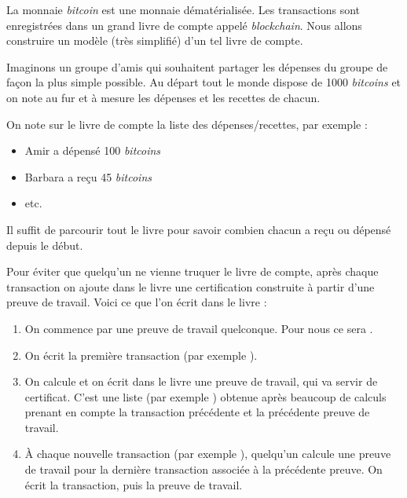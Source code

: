 \documentclass[11pt,class=report,crop=false]{standalone}
\begin{document}
\begin{cours}

La monnaie \emph{bitcoin} est une monnaie dématérialisée. Les transactions sont enregistrées dans un grand livre de compte appelé \emph{blockchain}. Nous allons construire un modèle (très simplifié) d'un tel livre de compte.


Imaginons un groupe d'amis qui souhaitent partager les dépenses du groupe de façon la plus simple possible. Au départ tout le monde dispose de 1000 \emph{bitcoins} et on note au fur et à mesure les dépenses et les recettes de chacun. 

On note sur le livre de compte la liste des dépenses/recettes, par exemple :
\begin{itemize}
  \item \og{}Amir a dépensé 100 \emph{bitcoins}\fg{}
  \item \og{}Barbara a reçu 45 \emph{bitcoins}\fg{}
  \item etc.
\end{itemize}
Il suffit de parcourir tout le livre pour savoir combien chacun a reçu ou dépensé depuis le début.

\bigskip

Pour éviter que quelqu'un ne vienne truquer le livre de compte, après chaque transaction on ajoute dans le livre une certification construite à partir d'une preuve de travail.
Voici ce que l'on écrit dans le livre :
\begin{enumerate}
  \item On commence par une preuve de travail quelconque. Pour nous ce sera 
  \ci{[0,0,0,0,0,0]}.
  \item On écrit la première transaction (par exemple ).
  \item On calcule et on écrit dans le livre une preuve de travail, qui va servir de certificat. C'est une liste
  (par exemple \ci{[56,42,10,98,2,34]}) obtenue après beaucoup de calculs prenant en compte la transaction précédente et la précédente preuve de travail.
  \item À chaque nouvelle transaction (par exemple ), quelqu'un calcule une preuve de travail pour la dernière transaction associée à la précédente preuve. On écrit la transaction, puis la preuve de travail.
\end{enumerate}




\end{cours}
\end{document}
